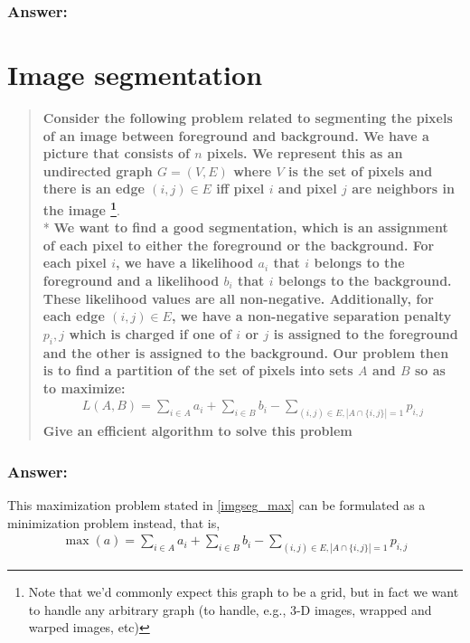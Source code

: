 \documentclass[titlepage]{article}\usepackage[]{graphicx}\usepackage[]{color}
\begin{document}
  \subsubsection{Answer:}
  \vspace{9cm}



\section{Image segmentation}
  \begin{quote}
    \textbf{Consider the following problem related to segmenting the pixels
      of an image between foreground and background. We have a picture that
      consists of $n$ pixels. We represent this as an undirected graph $G =
      (V,E)$ where $V$ is the set of pixels and there is an edge $(i,j) \in
      E$ iff pixel $i$ and pixel $j$ are neighbors in the image
      \footnote{Note that we'd commonly expect this graph to be a grid, but
        in fact we want to handle any arbitrary graph (to handle, e.g., 3-D
        images, wrapped and warped images, etc)}}. \\* 
        \textbf{We want to find
        a good segmentation, which is an assignment of each pixel to either
        the foreground or the background.  For each pixel $i$, we have a
        likelihood $a_i$ that $i$ belongs to the foreground and a likelihood
        $b_i$ that $i$ belongs to the background. These likelihood values are
        all non-negative. Additionally, for each edge $(i, j) \in E$, we have
        a non-negative separation penalty $p_i,j$ which is charged if one of
        $i$ or $j$ is assigned to the foreground and the other is assigned to
        the background.  Our problem then is to find a partition of the set
        of pixels into sets $A$ and $B$ so as to maximize:}
        \begin{align}
        \label{imgseg_max}
        L(A, B) = \sum_{i \in A}  a_i + \sum_{i \in B} b_i − \sum_{(i,j) \in E,
          | A \cap \{i,j\} | = 1} p_{i,j} 
        \end{align}
      \textbf{Give an efficient algorithm to solve this problem}
  \end{quote}

  \subsubsection{Answer:}

  This maximization problem stated in \ref{imgseg_max} can be formulated as a minimization problem instead,
  that is,
  \begin{align}
    \label{imgseq_min}
    \max(a) = \sum_{i \in A}  a_i + \sum_{i \in B} b_i − \sum_{(i,j) \in E, | A \cap \{i,j\} | = 1} p_{i,j} 
  \end{align}
\end{document}
